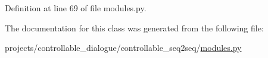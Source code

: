 Definition at line 69 of file modules.\+py.



The documentation for this class was generated from the following file\+:\begin{DoxyCompactItemize}
\item 
projects/controllable\+\_\+dialogue/controllable\+\_\+seq2seq/\hyperlink{projects_2controllable__dialogue_2controllable__seq2seq_2modules_8py}{modules.\+py}\end{DoxyCompactItemize}
